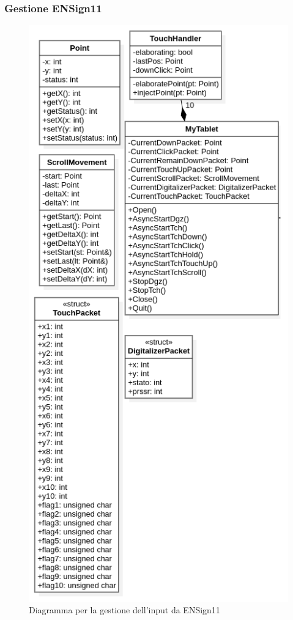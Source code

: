 \subsubsection{Gestione ENSign11}
\begin{figure}[h]
    \centering
    \includegraphics[width=340pt]{ProgettazioneTecnica/ENS11.png}
    \caption{Diagramma per la gestione dell'input da ENSign11}
    \label{fig:es11}
\end{figure}
